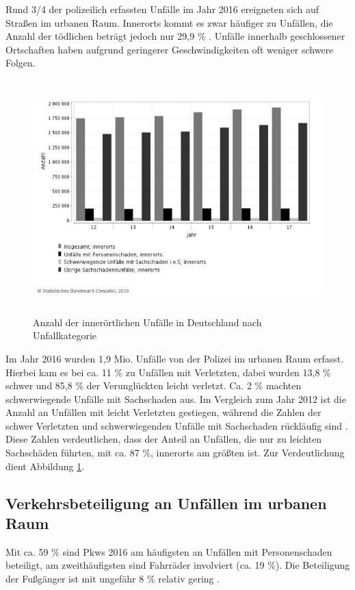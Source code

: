Rund 3/4 der polizeilich erfassten Unfälle im Jahr 2016 ereigneten sich auf Straßen im urbanen Raum. Innerorts kommt es zwar häufiger zu Unfällen, die Anzahl der tödlichen beträgt jedoch nur 29,9 \% \parencite[S. 149]{StatistischesBundesamt.2018}. Unfälle innerhalb geschlossener Ortschaften haben aufgrund geringerer Geschwindigkeiten oft weniger schwere Folgen.

\begin{savenotes}
	\begin{figure}[H]
		\centering
		\includegraphics[width=12cm,height=9cm]{figures/Schaden}
		\caption[Anzahl der innerörtlichen Unfälle in Deutschland nach Unfallkategorie]{Anzahl der innerörtlichen Unfälle in Deutschland nach Unfallkategorie \parencite{StatistischesBundesamt.2018d}}\label{fig:Schaden}
	\end{figure}
\end{savenotes}

Im Jahr 2016 wurden 1,9 Mio. Unfälle von der Polizei im urbanen Raum erfasst. Hierbei kam es bei ca. 11 \% zu Unfällen mit Verletzten, dabei wurden 13,8 \% schwer und 85,8 \% der Verunglückten leicht verletzt. Ca. 2 \% machten schwerwiegende Unfälle mit Sachschaden aus. Im Vergleich zum Jahr 2012 ist die Anzahl an Unfällen mit leicht Verletzten gestiegen, während die Zahlen der schwer Verletzten und schwerwiegenden Unfälle mit Sachschaden rückläufig sind \parencite[S. 21]{StatistischesBundesamt.2018c}. Diese Zahlen verdeutlichen, dass der Anteil an Unfällen, die nur zu leichten Sachschäden führten, mit ca. 87 \%, innerorts am größten ist. Zur Verdeutlichung dient Abbildung \ref{fig:Schaden}.

\subsection{Verkehrsbeteiligung an Unfällen im urbanen Raum}\label{subsection:Verkehrsbeteiligung an Unfällen im urbanen Raum}
Mit ca. 59 \% sind Pkws 2016 am häufigsten an Unfällen mit Personenschaden beteiligt, am zweithäufigsten sind Fahrräder involviert (ca. 19 \%). Die Beteiligung der Fußgänger ist mit ungefähr 8 \% relativ gering \parencite[S. 102]{StatistischesBundesamt.2018c}.

